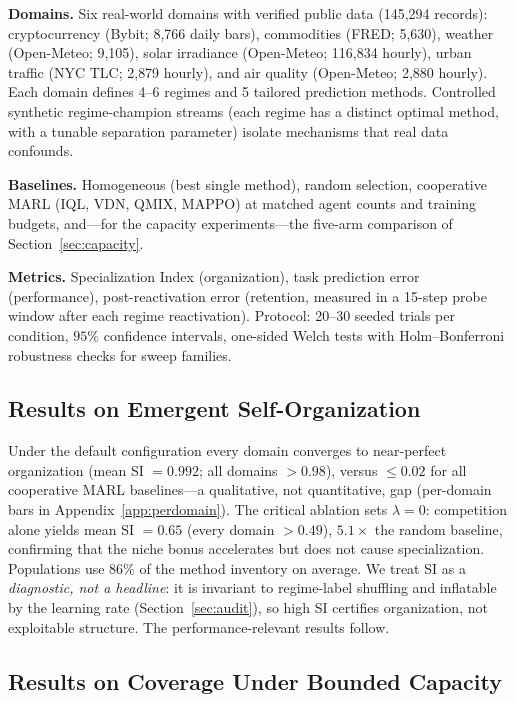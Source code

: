 \documentclass[10pt]{article}
\begin{document}
\textbf{Domains.} Six real-world domains with verified public data
(145{,}294 records): cryptocurrency (Bybit; 8{,}766 daily bars), commodities
(FRED; 5{,}630), weather (Open-Meteo; 9{,}105), solar irradiance (Open-Meteo;
116{,}834 hourly), urban traffic (NYC TLC; 2{,}879 hourly), and air quality
(Open-Meteo; 2{,}880 hourly). Each domain defines 4--6 regimes and 5 tailored
prediction methods. Controlled synthetic regime-champion streams (each regime
has a distinct optimal method, with a tunable separation parameter) isolate
mechanisms that real data confounds.

\textbf{Baselines.} Homogeneous (best single method), random selection,
cooperative MARL (IQL, VDN, QMIX, MAPPO) at matched agent counts and training
budgets, and---for the capacity experiments---the five-arm comparison of
Section~\ref{sec:capacity}.

\textbf{Metrics.} Specialization Index (organization), task prediction error
(performance), post-reactivation error (retention, measured in a 15-step probe
window after each regime reactivation). Protocol: 20--30 seeded trials per
condition, $95\%$ confidence intervals, one-sided Welch tests with
Holm--Bonferroni robustness checks for sweep families.

\subsection{Results on Emergent Self-Organization}

Under the default configuration every domain converges to near-perfect
organization (mean SI $= 0.992$; all domains $> 0.98$), versus $\le 0.02$ for all
cooperative MARL baselines---a qualitative, not quantitative, gap (per-domain bars
in Appendix~\ref{app:perdomain}). The critical ablation sets $\lambda = 0$:
competition alone yields mean SI $= 0.65$ (every domain $> 0.49$), $5.1\times$ the
random baseline, confirming that the niche bonus accelerates but does not cause
specialization. Populations use $86\%$ of the method inventory on average. We treat
SI as a \emph{diagnostic, not a headline}: it is invariant to regime-label shuffling
and inflatable by the learning rate (Section~\ref{sec:audit}), so high SI certifies
organization, not exploitable structure. The performance-relevant results follow.

\subsection{Results on Coverage Under Bounded Capacity}
\end{document}

